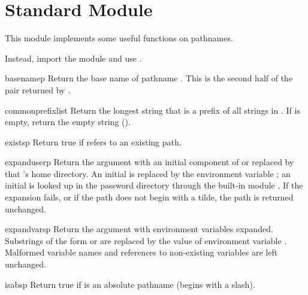 \section{Standard Module }
\label{module-posixpath}

This module implements some useful functions on \POSIX{} pathnames.

  Instead, import the
module  and use .


\begin{funcdesc}{basename}{p}
Return the base name of pathname
.
This is the second half of the pair returned by
.
\end{funcdesc}

\begin{funcdesc}{commonprefix}{list}
Return the longest string that is a prefix of all strings in
.
If
is empty, return the empty string ().
\end{funcdesc}

\begin{funcdesc}{exists}{p}
Return true if
refers to an existing path.
\end{funcdesc}

\begin{funcdesc}{expanduser}{p}
Return the argument with an initial component of \samp{\~} or
 replaced by that 's home directory.  An
initial \samp{\~{}} is replaced by the environment variable ;
an initial  is looked up in the password directory through
the built-in module .  If the expansion
fails, or if the path does not begin with a tilde, the path is
returned unchanged.
\end{funcdesc}

\begin{funcdesc}{expandvars}{p}
Return the argument with environment variables expanded.  Substrings
of the form  or  are
replaced by the value of environment variable .  Malformed
variable names and references to non-existing variables are left
unchanged.
\end{funcdesc}

\begin{funcdesc}{isabs}{p}
Return true if  is an absolute pathname (begins with a slash).
\end{funcdesc}

